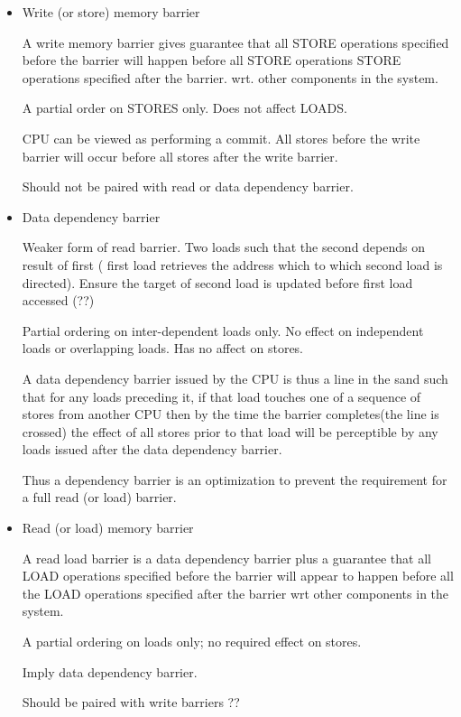 \documentclass{article}
\begin{document}
\begin{itemize}
\item Write (or store) memory barrier

  A write memory barrier gives guarantee that all STORE operations
  specified before the barrier will happen before all STORE operations
  STORE operations specified after the barrier. wrt. other components
  in the system.

  A partial order on STORES only. Does not affect LOADS.

  CPU can be viewed as performing a commit. All stores before the
  write barrier will occur before all stores after the write barrier.

  Should not be paired with read or data dependency barrier.
  
\item Data dependency barrier

  Weaker form of read barrier. Two loads such that the second depends
  on result of first ( first load retrieves the address which to which
  second load is directed). Ensure the target of second load is
  updated before first load accessed (??)

  Partial ordering on inter-dependent loads only. No effect on
  independent loads or overlapping loads. Has no affect on stores.

  A data dependency barrier issued by the CPU is thus a line in the
  sand such that for any loads preceding it, if that load touches one
  of a sequence of stores from another CPU then by the time the
  barrier completes(the line is crossed) the effect of all stores
  prior to that load will be perceptible by any loads issued after the
  data dependency barrier.

  Thus a dependency barrier is an optimization to prevent the
  requirement for a full read (or load) barrier.


\item Read (or load) memory barrier

  A read load barrier is a data dependency barrier plus a guarantee
  that all LOAD operations specified before the barrier will appear to
  happen before all the LOAD operations specified after the barrier
  wrt other components in the system.

  A partial ordering on loads only; no required effect on stores.

  Imply data dependency barrier.

  Should be paired with write barriers ??


\end{itemize}
\end{document}
